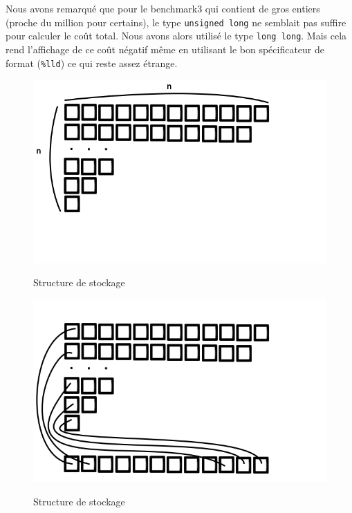 \documentclass[a4paper, 10pt, french]{article}
\begin{document}
    Nous avons remarqué que pour le benchmark3 qui contient de gros entiers (proche du million pour certains), le type {\tt unsigned long} ne semblait pas suffire pour calculer le coût total. Nous avons alors utilisé le type {\tt long long}. Mais cela rend l'affichage de ce coût négatif même en utilisant le bon spécificateur de format ({\tt \%lld}) ce qui reste assez étrange.



    \begin{figure}[p]
  \caption{Structure de stockage}
  \centering
  \includegraphics[scale=0.45]{struct1}
  \label{fig:struct1}
\end{figure}

      \begin{figure}[p]
  \caption{Structure de stockage}
  \centering
  \includegraphics[scale=0.45]{struct2}
  \label{fig:struct2}
\end{figure}
\end{document}
